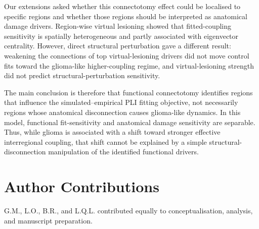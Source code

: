 \documentclass[11pt, reprint, aps, prl, floatfix, secnumarabic]{revtex4-2}
\begin{document}
Our extensions asked whether this connectotomy effect could be localised to specific regions and whether those regions should be interpreted as anatomical damage drivers. Region-wise virtual lesioning showed that fitted-coupling sensitivity is spatially heterogeneous and partly associated with eigenvector centrality. However, direct structural perturbation gave a different result: weakening the connections of top virtual-lesioning drivers did not move control fits toward the glioma-like higher-coupling regime, and virtual-lesioning strength did not predict structural-perturbation sensitivity.

The main conclusion is therefore that functional connectotomy identifies regions that influence the simulated--empirical PLI fitting objective, not necessarily regions whose anatomical disconnection causes glioma-like dynamics. In this model, functional fit-sensitivity and anatomical damage sensitivity are separable. Thus, while glioma is associated with a shift toward stronger effective interregional coupling, that shift cannot be explained by a simple structural-disconnection manipulation of the identified functional drivers.


\section{Author Contributions}
G.M., L.O., B.R., and L.Q.L. contributed equally to conceptualisation, analysis, and manuscript preparation.
\vspace{-0.8em}







\end{document}
